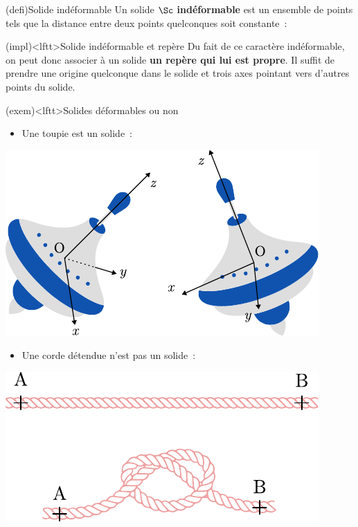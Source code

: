 \documentclass[../../main/main.tex]{subfiles}
\begin{document}
\begin{tcb*}(defi){Solide indéformable}
	Un solide $\Sc$ \textbf{indéformable} est un ensemble de points tels que la
	distance entre deux points quelconques soit constante~:
	\psw{
		\[
			\forall (\Mr_1,\Mr_2) \in ({\rm solide}), \quad {\rm M_1M_2} = \cte
		\]
	}
	\vspace{-15pt}
\end{tcb*}
\begin{tcb*}(impl)<lftt>{Solide indéformable et repère}
	Du fait de ce caractère indéformable, on peut donc associer à un solide
	\textbf{un repère qui lui est propre}. Il suffit de prendre une origine
	quelconque dans le solide et trois axes pointant vers d'autres points du
	solide.
\end{tcb*}
\begin{tcb*}(exem)<lftt>{Solides déformables ou non}
	\begin{isd}[sidebyside align=top]
		\begin{itemize}
			\item Une toupie est un solide~:
		\end{itemize}
		\begin{center}
			\includegraphics[width=\linewidth]{toup_indef}
		\end{center}
		\tcblower
		\begin{itemize}
			\item Une corde détendue n'est pas un solide~:
		\end{itemize}
		\begin{center}
			\includegraphics[width=\linewidth]{cord_def}
		\end{center}
	\end{isd}
\end{tcb*}
\end{document}

